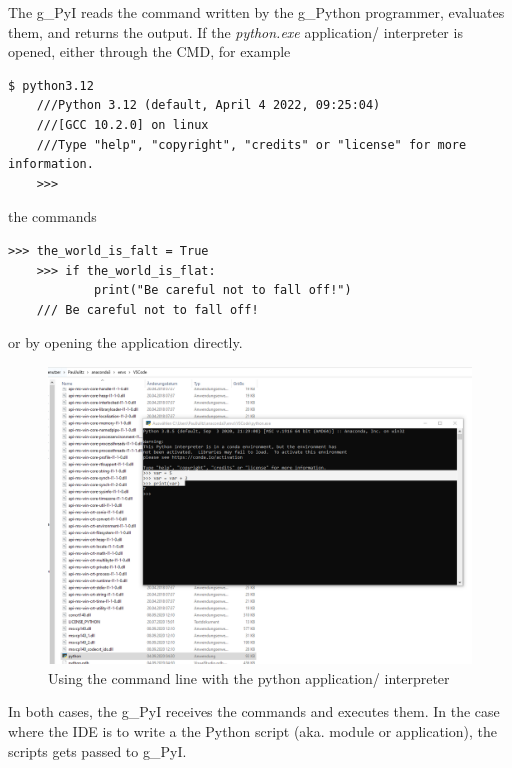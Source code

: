 The \gls{g_PyI} reads the command written by the \gls{g_Python} programmer, evaluates them, and returns the output. If the \textit{python.exe} application/ interpreter is opened, either through the \gls{CMD}, for example  
\begin{lstlisting}[language=iCMD]
	$ python3.12
	///Python 3.12 (default, April 4 2022, 09:25:04)
	///[GCC 10.2.0] on linux
	///Type "help", "copyright", "credits" or "license" for more information.
	>>>
\end{lstlisting}
the commands
\begin{lstlisting}[language=iCMD]
	>>> the_world_is_falt = True
	>>> if the_world_is_flat:
			print("Be careful not to fall off!")
	/// Be careful not to fall off!
\end{lstlisting}
or by opening the application directly.
\begin{figure}[H]
	\centering
	\includegraphics[scale = 0.2]{attachment/chapter_AML/Scc003}
	\caption{Using the command line with the python application/ interpreter}
\end{figure}
In both cases, the \gls{g_PyI} receives the commands and executes them. In the case where the \gls{IDE} is to write a the Python script (aka. module or application), the scripts gets passed to \gls{g_PyI}.\\


